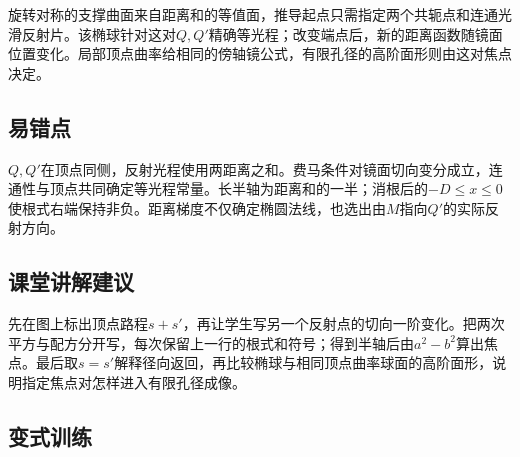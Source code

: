 \documentclass[UTF8,fontset=fandol,a4paper,11pt]{ctexart}
\begin{document}
旋转对称的支撑曲面来自距离和的等值面，推导起点只需指定两个共轭点和连通光滑反射片。该椭球针对这对$Q,Q'$精确等光程；改变端点后，新的距离函数随镜面位置变化。局部顶点曲率给相同的傍轴镜公式，有限孔径的高阶面形则由这对焦点决定。



\subsection*{易错点}

$Q,Q'$在顶点同侧，反射光程使用两距离之和。费马条件对镜面切向变分成立，连通性与顶点共同确定等光程常量。长半轴为距离和的一半；消根后的$-D\leqslant x\leqslant0$使根式右端保持非负。距离梯度不仅确定椭圆法线，也选出由$M$指向$Q'$的实际反射方向。



\subsection*{课堂讲解建议}

先在图上标出顶点路程$s+s'$，再让学生写另一个反射点的切向一阶变化。把两次平方与配方分开写，每次保留上一行的根式和符号；得到半轴后由$a^2-b^2$算出焦点。最后取$s=s'$解释径向返回，再比较椭球与相同顶点曲率球面的高阶面形，说明指定焦点对怎样进入有限孔径成像。



\subsection*{变式训练}
\end{document}
